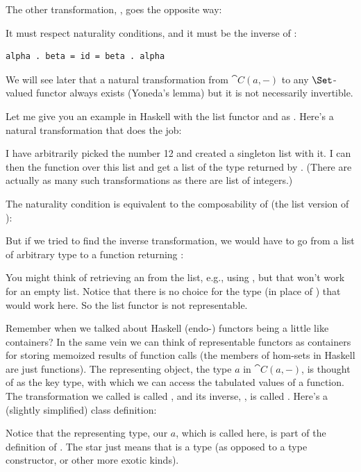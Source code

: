 The other transformation, , goes the opposite way:

It must respect naturality conditions, and it must be the inverse of :

\begin{Verbatim}
alpha . beta = id = beta . alpha
\end{Verbatim}
We will see later that a natural transformation from $\cat{C}(a, -)$
to any $\Set$-valued functor always exists (Yoneda's lemma) but it
is not necessarily invertible.

Let me give you an example in Haskell with the list functor and
 as . Here's a natural transformation that does
the job:

I have arbitrarily picked the number 12 and created a singleton list
with it. I can then  the function  over this list
and get a list of the type returned by . (There are actually
as many such transformations as there are list of integers.)

The naturality condition is equivalent to the composability of
 (the list version of ):

But if we tried to find the inverse transformation, we would have to go
from a list of arbitrary type  to a function returning
:

You might think of retrieving an  from the list, e.g., using
, but that won't work for an empty list. Notice that there
is no choice for the type  (in place of ) that
would work here. So the list functor is not representable.

Remember when we talked about Haskell (endo-) functors being a little
like containers? In the same vein we can think of representable functors
as containers for storing memoized results of function calls (the
members of hom-sets in Haskell are just functions). The representing
object, the type $a$ in $\cat{C}(a, -)$, is thought of as the
key type, with which we can access the tabulated values of a function.
The transformation we called  is called , and its
inverse, , is called . Here's a (slightly simplified)
 class definition:

Notice that the representing type, our $a$, which is called
 here, is part of the definition of
. The star just means that  is a
type (as opposed to a type constructor, or other more exotic kinds).


